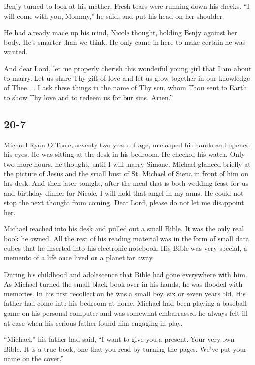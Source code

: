 \documentclass[]{article}
\begin{document}
{Benjy turned to look at his mother. Fresh tears were running down his cheeks. “I will come with you, Mommy,” he said, and put his head on her shoulder.

He had already made up his mind, Nicole thought, holding Benjy against her body. He’s smarter than we think. He only came in here to make certain he was wanted.

And dear Lord, let me properly cherish this wonderful young girl that I am about to marry. Let us share Thy gift of love and let us grow together in our knowledge of Thee. … I ask these things in the name of Thy son, whom Thou sent to Earth to show Thy love and to redeem us for bur sins. Amen.”

\subsection{20-7}

Michael Ryan O’Toole, seventy-two years of age, unclasped his hands and opened his eyes. He was sitting at the desk in his bedroom. He checked his watch. Only two more hours, he thought, until I will marry Simone. Michael glanced briefly at the picture of Jesus and the small bust of St. Michael of Siena in front of him on his desk. And then later tonight, after the meal that is both wedding feast for us and birthday dinner for Nicole, I will hold that angel in my arms. He could not stop the next thought from coming. Dear Lord, please do not let me disappoint her.

Michael reached into his desk and pulled out a small Bible. It was the only real book he owned. All the rest of his reading material was in the form of small data cubes that he inserted into his electronic notebook. His Bible was very special, a memento of a life once lived on a planet far away.

During his childhood and adolescence that Bible had gone everywhere with him. As Michael turned the small black book over in his hands, he was flooded with memories. In his first recollection he was a small boy, six or seven years old. His father had come into his bedroom at home. Michael had been playing a baseball game on his personal computer and was somewhat embarrassed-he always felt ill at ease when his serious father found him engaging in play.

“Michael,” his father had said, “I want to give you a present. Your very own Bible. It is a true book, one that you read by turning the pages. We’ve put your name on the cover.”

}
\end{document}
